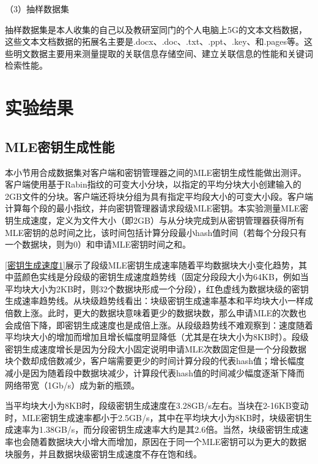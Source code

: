 \documentclass[promaster]{thesis-uestc}
\begin{document}
（3）抽样数据集

抽样数据集是本人收集的自己以及教研室同门的个人电脑上5G的文本文档数据，这些文本文档数据的拓展名主要是.docx、.doc、.txt、.ppt、.key、和.pages等。这些明文数据主要用来测量提取的关联信息存储空间、建立关联信息的性能和关键词检索性能。

\section{实验结果}
\subsection{MLE密钥生成性能}\label{MLE密钥生成性能}
本小节用合成数据集对客户端和密钥管理器之间的MLE密钥生成性能做出测评。客户端使用基于Rabin指纹的可变大小分块，以指定的平均分块大小创建输入的2GB文件的分块。客户端还将块分组为具有指定平均段大小的可变大小段。客户端计算每个段的最小指纹，并向密钥管理器请求段级MLE密钥。本实验测量MLE密钥生成速度，定义为文件大小（即2GB）与从分块完成到从密钥管理器获得所有MLE密钥的总时间之比，该时间包括计算分段最小hash值时间（若每个分段只有一个数据块，则为0）和申请MLE密钥时间之和。

\ref{密钥生成速度1}展示了段级MLE密钥生成速率随着平均数据块大小变化趋势，其中蓝颜色实线是分段级的密钥生成速度趋势线（固定分段段大小为64KB，例如当平均块大小为2KB时，则32个数据块形成一个分段），红色虚线为数据块级的密钥生成速率趋势线。从块级趋势线看出：块级密钥生成速率基本和平均块大小一样成倍数上涨。此时，更大的数据块意味着更少的数据块数，那么申请MLE的次数也会成倍下降，即密钥生成速度也是成倍上涨。从段级趋势线不难观察到：速度随着平均块大小的增加而增加且增长幅度明显降低（尤其是在块大小为8KB时）。段级密钥生成速度增长是因为分段大小固定说明申请MLE次数固定但是一个分段数据块个数却成倍数减少，客户端需要更少的时间计算分段的代表hash值；增长幅度减小是因为随着段中数据块减少，计算段代表hash值的时间减少幅度逐渐下降而网络带宽（1Gb/s）成为新的瓶颈。

当平均块大小为8KB时，段级密钥生成速度在3.28GB/s左右。当块在2-16KB变动时，MLE密钥生成速率都小于2.5GB/s，其中在平均块大小为8KB时，块级密钥生成速率为1.38GB/s，而分段密钥生成速率大约是其2.6倍。当然，块级密钥生成速率也会随着数据块大小增大而增加，原因在于同一个MLE密钥可以为更大的数据块服务，并且数据块级密钥生成速度不存在饱和线。
\end{document}
